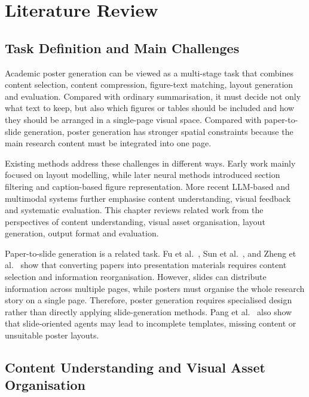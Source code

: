 \documentclass[12pt,oneside]{report}
\begin{document}

\chapter{Literature Review}

\section{Task Definition and Main Challenges}

Academic poster generation can be viewed as a multi-stage task that combines content selection, content compression, figure-text matching, layout generation and evaluation. Compared with ordinary summarisation, it must decide not only what text to keep, but also which figures or tables should be included and how they should be arranged in a single-page visual space. Compared with paper-to-slide generation, poster generation has stronger spatial constraints because the main research content must be integrated into one page.

\vspace{1em}

Existing methods address these challenges in different ways. Early work mainly focused on layout modelling, while later neural methods introduced section filtering and caption-based figure representation. More recent LLM-based and multimodal systems further emphasise content understanding, visual feedback and systematic evaluation. This chapter reviews related work from the perspectives of content understanding, visual asset organisation, layout generation, output format and evaluation.

\vspace{1em}

Paper-to-slide generation is a related task. Fu et al.~\cite{doc2ppt}, Sun et al.~\cite{d2s}, and Zheng et al.~\cite{pptagent} show that converting papers into presentation materials requires content selection and information reorganisation. However, slides can distribute information across multiple pages, while posters must organise the whole research story on a single page. Therefore, poster generation requires specialised design rather than directly applying slide-generation methods. Pang et al.~\cite{paper2poster} also show that slide-oriented agents may lead to incomplete templates, missing content or unsuitable poster layouts.

\section{Content Understanding and Visual Asset Organisation}
\end{document}
